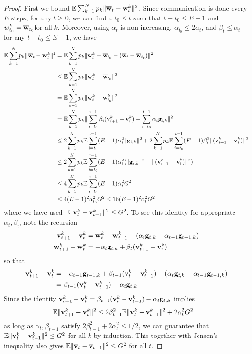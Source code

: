 \begin{proof}
First we bound $\mathbb{E}\sum_{k=1}^{N}p_{k}\|{\overline{\mathbf{w}}}_{t}-{\mathbf{w}}_{t}^{k}\|^{2}$.
Since communication is done every $E$ steps, for any $t\geq0$, we
can find a $t_{0}\leq t$ such that $t-t_{0}\leq E-1$ and $w_{t_{0}}^{k}={\overline{\mathbf{w}}}_{t_{0}}$for
all $k$. Moreover, using $\alpha_{t}$ is non-increasing, $\alpha_{t_{0}}\leq2\alpha{}_{t}$,
and $\beta_{t}\leq\alpha_{t}$ for any $t-t_{0}\leq E-1$, we have
\begin{align*}
\mathbb{E}\sum_{k=1}^{N}p_{k}\|{\overline{\mathbf{w}}}_{t}-{\mathbf{w}}_{t}^{k}\|^{2} & =\mathbb{E}\sum_{k=1}^{N}p_{k}\|{\mathbf{w}}_{t}^{k}-{\overline{\mathbf{w}}}_{t_{0}}-({\overline{\mathbf{w}}}_{t}-{\overline{\mathbf{w}}}_{t_{0}})\|^{2}\\
& \leq\mathbb{E}\sum_{k=1}^{N}p_{k}\|{\mathbf{w}}_{t}^{k}-{\overline{\mathbf{w}}}_{t_{0}}\|^{2}\\
& =\mathbb{E}\sum_{k=1}^{N}p_{k}\|{\mathbf{w}}_{t}^{k}-{\mathbf{w}}_{t_{0}}^{k}\|^{2}\\
& =\mathbb{E}\sum_{k=1}^{N}p_{k}\|\sum_{i=t_{0}}^{t-1}\beta_{i}({\mathbf{v}}_{i+1}^{k}-{\mathbf{v}}_{i}^{k})-\sum_{i=t_{0}}^{t-1}\alpha_{i}{\mathbf{g}}_{i,k}\|^{2}\\
& \leq2\sum_{k=1}^{N}p_{k}\mathbb{E}\sum_{i=t_{0}}^{t-1}(E-1)\alpha_{i}^{2}\|{\mathbf{g}}_{i,k}\|^{2}+2\sum_{k=1}^{N}p_{k}\mathbb{E}\sum_{i=t_{0}}^{t-1}(E-1)\beta_{i}^{2}\|({\mathbf{v}}_{i+1}^{k}-{\mathbf{v}}_{i}^{k})\|^{2}\\
& \leq2\sum_{k=1}^{N}p_{k}\mathbb{E}\sum_{i=t_{0}}^{t-1}(E-1)\alpha_{i}^{2}(\|{\mathbf{g}}_{i,k}\|^{2}+\|({\mathbf{v}}_{i+1}^{k}-{\mathbf{v}}_{i}^{k})\|^{2})\\
& \leq4\sum_{k=1}^{N}p_{k}\mathbb{E}\sum_{i=t_{0}}^{t-1}(E-1)\alpha_{i}^{2}G^{2}\\
& \leq4(E-1)^{2}\alpha_{t_{0}}^{2}G^{2}\leq16(E-1)^{2}\alpha_{t}^{2}G^{2}
\end{align*}
where we have used $\mathbb{E}\|{\mathbf{v}}_{t}^{k}-{\mathbf{v}}_{t-1}^{k}\|^{2}\leq G^{2}$.
To see this identity for appropriate $\alpha_{t},\beta_{t}$, note
the recursion 
\begin{align*}
{\mathbf{v}}_{t+1}^{k}-{\mathbf{v}}_{t}^{k} & ={\mathbf{w}}_{t}^{k}-{\mathbf{w}}_{t-1}^{k}-(\alpha_{t}{\mathbf{g}}_{t,k}-\alpha_{t-1}{\mathbf{g}}_{t-1,k})\\
{\mathbf{w}}_{t+1}^{k}-{\mathbf{w}}_{t}^{k} & =-\alpha_{t}{\mathbf{g}}_{t,k}+\beta_{t}({\mathbf{v}}_{t+1}^{k}-{\mathbf{v}}_{t}^{k})
\end{align*}
so that 
\begin{align*}
{\mathbf{v}}_{t+1}^{k}-{\mathbf{v}}_{t}^{k} & =-\alpha_{t-1}{\mathbf{g}}_{t-1,k}+\beta_{t-1}({\mathbf{v}}_{t}^{k}-{\mathbf{v}}_{t-1}^{k})-(\alpha_{t}{\mathbf{g}}_{t,k}-\alpha_{t-1}{\mathbf{g}}_{t-1,k})\\
& =\beta_{t-1}({\mathbf{v}}_{t}^{k}-{\mathbf{v}}_{t-1}^{k})-\alpha_{t}{\mathbf{g}}_{t,k}
\end{align*}
Since the identity ${\mathbf{v}}_{t+1}^{k}-{\mathbf{v}}_{t}^{k}=\beta_{t-1}({\mathbf{v}}_{t}^{k}-{\mathbf{v}}_{t-1}^{k})-\alpha_{t}{\mathbf{g}}_{t,k}$
implies 
\begin{align*}
\mathbb{E}\|{\mathbf{v}}_{t+1}^{k}-{\mathbf{v}}_{t}^{k}\|^{2} & \leq2\beta_{t-1}^{2}\mathbb{E}\|{\mathbf{v}}_{t}^{k}-{\mathbf{v}}_{t-1}^{k}\|^{2}+2\alpha_{t}^{2}G^{2}
\end{align*}
as long as $\alpha_{t},\beta_{t-1}$ satisfy $2\beta_{t-1}^{2}+2\alpha_{t}^{2}\leq1/2$,
we can guarantee that $\mathbb{E}\|{\mathbf{v}}_{t}^{k}-{\mathbf{v}}_{t-1}^{k}\|^{2}\leq G^{2}$
for all $k$ by induction. This together with Jensen's inequality
also gives $\mathbb{E}\|{\overline{\mathbf{v}}}_{t}-{\overline{\mathbf{v}}}_{t-1}\|^{2}\leq G^{2}$
for all $t$. 


\end{proof}
